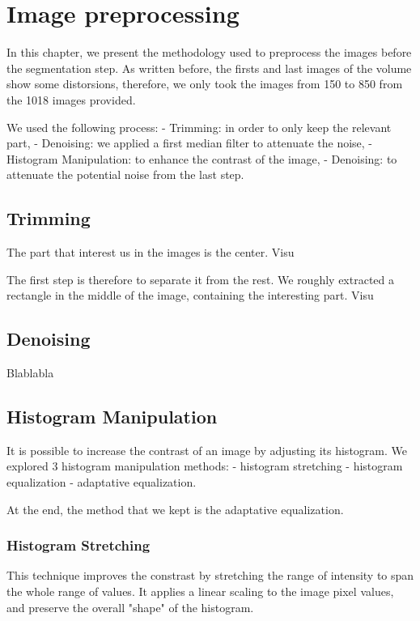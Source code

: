 \documentclass{report}
\begin{document}
\chapter{Image preprocessing}

In this chapter, we present the methodology used to preprocess the images before the segmentation step.
As written before, the firsts and last images of the volume show some distorsions, therefore, we only took the images from 150 to 850 from the 1018 images provided. \newline

We used the following process:  
- Trimming: in order to only keep the relevant part,  
- Denoising: we applied a first median filter to attenuate the noise,  
- Histogram Manipulation: to enhance the contrast of the image,  
- Denoising: to attenuate the potential noise from the last step.

\section{Trimming}

 The part that interest us in the images is the center.   
Visu

The first step is therefore to separate it from the rest. We roughly extracted a rectangle in the middle of the image, containing the interesting part.
Visu

\section{Denoising}
Blablabla

\section{Histogram Manipulation}

It is possible to increase the contrast of an image by adjusting its histogram.   
We explored 3 histogram manipulation methods:  
- histogram stretching  
- histogram equalization  
- adaptative equalization.  \newline

At the end, the method that we kept is the adaptative equalization.

\subsection{Histogram Stretching}

This technique improves the constrast by stretching the range of intensity to span the whole range of values. It applies a linear scaling to the image pixel values, and preserve the overall "shape" of the histogram.
\end{document}
